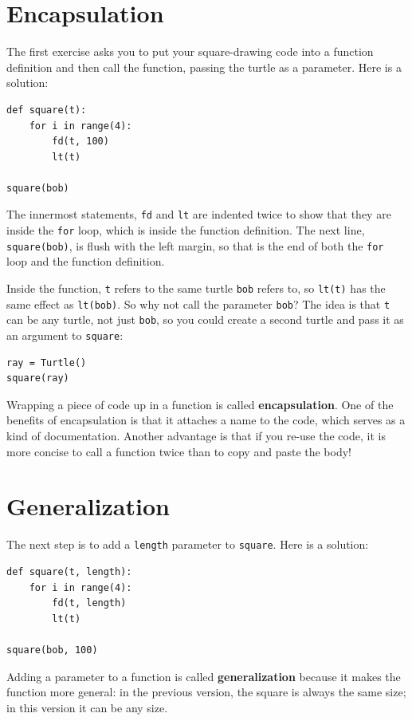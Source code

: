 \documentclass[10pt]{book}
\begin{document}
\section{Encapsulation}

The first exercise asks you to put your square-drawing code
into a function definition and then call the function, passing
the turtle as a parameter.  Here is a solution:

\begin{verbatim}
def square(t):
    for i in range(4):
        fd(t, 100)
        lt(t)

square(bob)
\end{verbatim}
%
The innermost statements, {\tt fd} and {\tt lt} are
indented twice to show that they are inside the {\tt for} loop,
which is inside the function definition.  The next line,
{\tt square(bob)}, is flush with the left margin, so that is the
end of both the {\tt for} loop and the function definition.

Inside the function, {\tt t} refers to the same turtle {\tt bob}
refers to, so {\tt lt(t)} has the same effect as {\tt lt(bob)}.
So why not call the parameter {\tt bob}?  The idea is that {\tt t}
can be any turtle, not just {\tt bob}, so you could create
a second turtle and pass it as an argument to {\tt square}:

\begin{verbatim}
ray = Turtle()
square(ray)
\end{verbatim}
%
Wrapping a piece of code up in a function is called {\bf
encapsulation}.  One of the benefits of encapsulation is that it
attaches a name to the code, which serves as a kind of documentation.
Another advantage is that if you re-use the code, it is more concise
to call a function twice than to copy and paste the body!


\section{Generalization}

The next step is to add a {\tt length} parameter to {\tt square}.
Here is a solution:

\begin{verbatim}
def square(t, length):
    for i in range(4):
        fd(t, length)
        lt(t)

square(bob, 100)
\end{verbatim}
%
Adding a parameter to a function is called {\bf generalization}
because it makes the function more general: in the previous
version, the square is always the same size; in this version
it can be any size.
\end{document}
